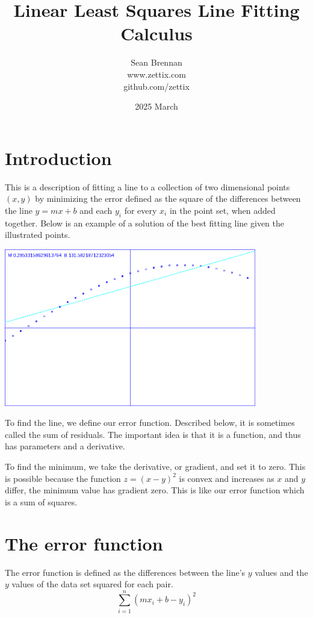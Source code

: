 \documentclass{article}
\title{Linear Least Squares Line Fitting Calculus}
\date{2025 March}
\author{Sean Brennan \\ www.zettix.com \\ github.com/zettix}
\begin{document}
\maketitle


\section{Introduction}
This is a description of fitting a line to a collection of
two dimensional points $(x,y)$ by minimizing the error defined
as the square of the differences between the line $y = mx + b$ and each $y_i$ for every $x_i$ in the point set, when added together.  Below is an example of
a solution of the best fitting line given the illustrated points.

\includegraphics[width=110mm]{whiteplot.png}

To find the line, we define our error function. Described below,
it is sometimes called the sum of residuals. The important idea is that
it is a function, and thus has parameters and a derivative.

To find the minimum, we take the derivative, or gradient, and set it to zero.
This is possible because the function $z = (x - y)^2$ is convex and increases
as $x$ and $y$ differ, the minimum value has gradient zero.  This is like
our error function which is a sum of squares.

\section{The error function}

The error function is defined as the differences between
the line's $y$ values and the $y$ values of the data set squared for each pair.
\begin{equation}
\sum_{i=1}^{n}\left(m x_i + b - y_i\right)^2
\end{equation}
\end{document}

